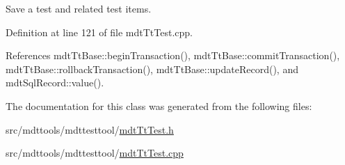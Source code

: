 Save a test and related test items. 



Definition at line 121 of file mdt\-Tt\-Test.\-cpp.



References mdt\-Tt\-Base\-::begin\-Transaction(), mdt\-Tt\-Base\-::commit\-Transaction(), mdt\-Tt\-Base\-::rollback\-Transaction(), mdt\-Tt\-Base\-::update\-Record(), and mdt\-Sql\-Record\-::value().



The documentation for this class was generated from the following files\-:\begin{DoxyCompactItemize}
\item 
src/mdttools/mdttesttool/\hyperlink{mdt_tt_test_8h}{mdt\-Tt\-Test.\-h}\item 
src/mdttools/mdttesttool/\hyperlink{mdt_tt_test_8cpp}{mdt\-Tt\-Test.\-cpp}\end{DoxyCompactItemize}
